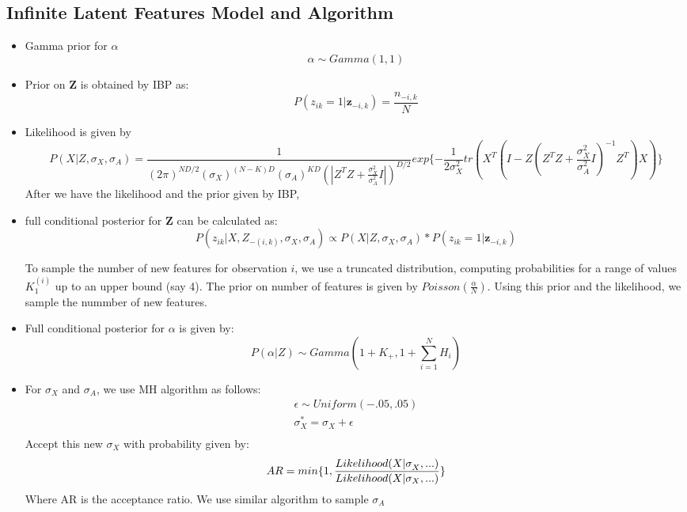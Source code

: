 \documentclass{article}
\begin{document}
\subsection{Infinite Latent Features Model and Algorithm}
\begin{itemize}
\item{Gamma prior for $\alpha$
$$
\alpha \sim Gamma(1,1)
$$}
\item{Prior on \textbf{Z} is obtained by IBP as:
$$
P(z_{ik}=1|\textbf{z}_{-i,k}) = \frac{n_{-i,k}}{N}
$$}

\item{Likelihood is given by
\begin{equation}
P(X|Z,\sigma_X, \sigma_A) = \frac{1}{(2 \pi)^{ND/2} (\sigma_X)^{(N-K)D}(\sigma_A)^{KD}(|Z^TZ+\frac{\sigma_X^2}{\sigma_A^2}I|)^{D/2}}exp\{-\frac{1}{2\sigma_X^2}tr(X^T(I-Z(Z^TZ+\frac{\sigma_X^2}{\sigma_A^2}I)^{-1}Z^T)X)\}
\end{equation}
}
After we have the likelihood and the prior given by IBP,
\item{full conditional posterior for \textbf{Z} can be calculated as:
$$
P(z_{ik}|X,Z_{-(i,k)},\sigma_X,\sigma_A) \propto  P(X|Z,\sigma_X, \sigma_A) * P(z_{ik}=1|\textbf{z}_{-i,k}) 
$$
}

To sample the number of new features for observation $i$, we use a truncated distribution, computing probabilities for a range of values $K_1^{(i)}$ up to an upper bound (say 4). The prior on number of features is given by $Poisson(\frac{\alpha}{N})$.
Using this prior and the likelihood, we sample the nummber of new features.

\item{Full conditional posterior for $\alpha$ is given by:
$$
P(\alpha|Z) \sim Gamma(1+K_+,1+\sum_{i=1}^{N} H_i)
$$}

\item{For $\sigma_X$ and $\sigma_A$, we use MH algorithm as follows:
\begin{eqnarray}
\epsilon \sim Uniform(-.05,.05)\\
\sigma_X^{*} =  \sigma_X +\epsilon\\
\end{eqnarray}
Accept this new $\sigma_X$ with probability given by:
$$
AR = min\{1,\frac{Likelihood(X|\sigma_X^{\*},...)}{Likelihood(X|\sigma_X,...)}\}\\
$$
Where AR is the acceptance ratio. We use similar algorithm to sample $\sigma_A$}

\end{itemize}
\end{document}
